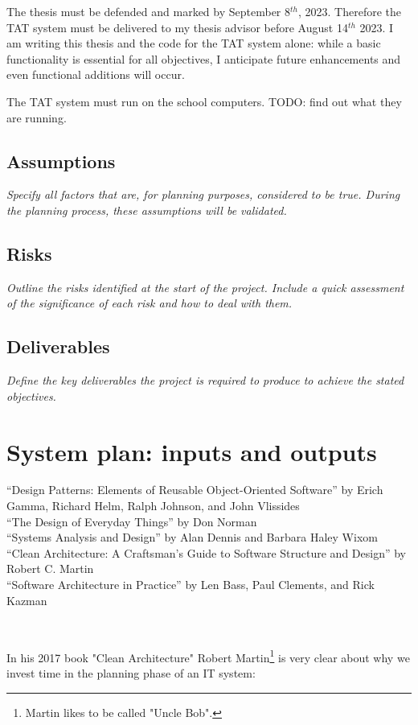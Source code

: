 \documentclass[10pt]{article}
\begin{document}
The thesis must be defended and marked by September 8$^{th}$, 2023. Therefore the TAT system must be delivered to my thesis advisor before August 14$^{th}$ 2023. I am writing this thesis and the code for the TAT system alone: while a basic functionality is essential for all objectives, I anticipate future enhancements and even functional additions will occur.

The TAT system must run on the school computers. TODO: find out what they are running.

\subsection{Assumptions} 
\emph{Specify all factors that are, for planning purposes, considered to be true. During the planning process, these assumptions will be validated.}


\subsection{Risks} 
\emph{Outline the risks identified at the start of the project. Include a quick assessment of the significance of each risk and how to deal with them.}

\subsection{Deliverables} 
\emph{Define the key deliverables the project is required to produce to achieve the stated objectives.}



\section{System plan: inputs and outputs} \label{inout}

“Design Patterns: Elements of Reusable Object-Oriented Software” by Erich Gamma, Richard Helm, Ralph Johnson, and John Vlissides \\
“The Design of Everyday Things” by Don Norman \\
“Systems Analysis and Design” by Alan Dennis and Barbara Haley Wixom\\
“Clean Architecture: A Craftsman’s Guide to Software Structure and Design” by Robert C. Martin\\
“Software Architecture in Practice” by Len Bass, Paul Clements, and Rick Kazman

\

In his 2017 book "Clean Architecture" Robert Martin\footnote{Martin likes to be called "Uncle Bob".} is very clear about why we invest time in the planning phase of an IT system:
\end{document}
